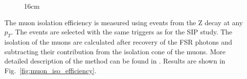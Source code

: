 \begin{figure}[hbtp]{16cm}
	\quad
	\label{fig:muon_sip_efficiency}
\end{figure}

The muon isolation efficiency is measured using events from the Z decay at any $p_{T}$. The events are selected with the same triggers as for the SIP study. The isolation of the muons are calculated after recovery of the FSR photons and subtracting their contribution from the isolation cone of the muons. More detailed description of the method can be found in \cite{bib:CMS-AN-16-328}. Results are shown in Fig.~\ref{fig:muon_iso_efficiency}.

